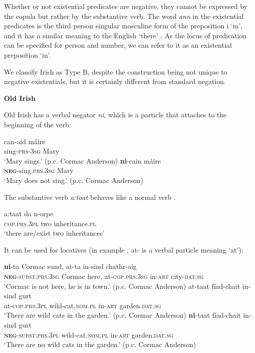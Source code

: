 \documentclass[output=paper]{langsci/langscibook}
\begin{document}
\begin{unindented}
Whether or not existential predicates are negative, they cannot be
expressed by the copula but rather by the substantive verb. The word
\textit{ann} in the existential predicates is the third person singular
masculine form of the preposition i `in', and it has a similar meaning to
the English `there' \parencite[see][11]{Stenson2008}. As the locus of predication can be specified for person and number, we can refer to it as an existential preposition `in'.

We classify Irish as Type B, despite the construction being not unique to negative existentials, but it is certainly different from standard negation.

\textbf{Old Irish}

Old Irish has a verbal negator \textit{ni}, which is a particle that attaches to the beginning of the verb: 
%
\begin{exe}\ex \gll can-aid máire \\
sing-\textsc{prs-3sg} Mary \\
    \glt `Mary sings.' (p.c. Cormac Anderson)
\ex \gll \textbf{ni}-cain máire \\
\textbf{\textsc{neg}}-sing.\textsc{prs.3sg} Mary \\
    \glt `Mary does not sing.' (p.c. Cormac Anderson)
    \end{exe} 

The substantive verb \textit{a:taat} behaves like a normal verb \citep[40]{McCone2005}.
%
\begin{exe}\ex \gll a:taat da n-orpe \\
\textsc{cop.prs.3pl} two inheritance.\textsc{pl} \\
    \glt `there are/exist two inheritances' \citep[40]{McCone2005}
    \end{exe}

It can be used for locatives (in example , at- is a verbal particle meaning `at'):

\begin{exe}\ex
    \gll \textbf{ni}-ta Cormac sund,  at-ta in-sind chathr-aig \\
\textbf{\textsc{neg}}\textsc{-subst.prs.3sg} Cormac here,  at-\textsc{cop.prs.3sg} in-\textsc{art}  city-\textsc{dat.sg} \\
    \glt `Cormac is not here, he is in town.' (p.c. Cormac Anderson)
\ex\label{ex:ieur-app-irish-Cormac} 
    \gll at-taat fíad-chait in-sind gurt \\
at-\textsc{cop.prs.3pl} wild-cat.\textsc{nom.pl} in-\textsc{art} garden.\textsc{dat.sg} \\
    \glt `There are wild cats in the garden.' (p.c. Cormac Anderson)
\ex \gll \textbf{ni}-taat fíad-chait in-sind gurt \\
\textbf{\textsc{neg}}\textsc{-subst.prs.3pl} wild-cat.\textsc{nom.pl} in-\textsc{art} garden.\textsc{dat.sg} \\
    \glt `There are no wild cats in the garden.' (p.c. Cormac Anderson)
    \end{exe}


\end{unindented}
\end{document}

